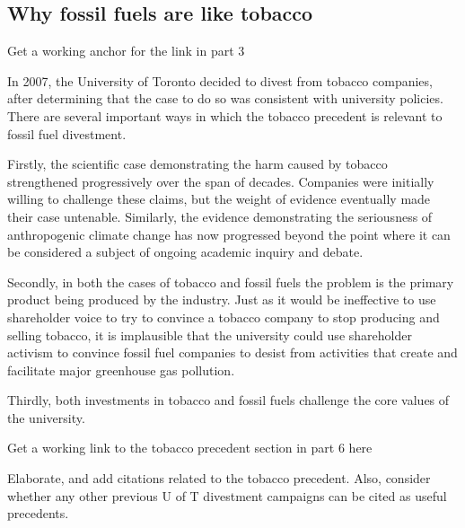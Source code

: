 	\subsection{Why fossil fuels are like tobacco}


\begin{vcom}
		Get a working anchor for the link in part 3
\end{vcom}




In 2007, the University of Toronto decided to divest from tobacco companies, after determining that the case to do so was consistent with university policies.
There are several important ways in which the tobacco precedent is relevant to fossil fuel divestment.



Firstly, the scientific case demonstrating the harm caused by tobacco strengthened progressively over the span of decades.
Companies were initially willing to challenge these claims, but the weight of evidence eventually made their case untenable.
Similarly, the evidence demonstrating the seriousness of anthropogenic climate change has now progressed beyond the point where it can be considered a subject of ongoing academic inquiry and debate.


Secondly, in both the cases of tobacco and fossil fuels the problem is the primary product being produced by the industry.
Just as it would be ineffective to use shareholder voice to try to convince a tobacco company to stop producing and selling tobacco, it is implausible that the university could use shareholder activism to convince fossil fuel companies to desist from activities that create and facilitate major greenhouse gas pollution.



Thirdly, both investments in tobacco and fossil fuels challenge the core values of the university.



\begin{vcom}
	Get a working link to the tobacco precedent section in part 6 here
\end{vcom}







\begin{vcom}
Elaborate, and add citations related to the tobacco precedent. Also, consider whether any other previous U of T divestment campaigns can be cited as useful precedents.
\end{vcom}



